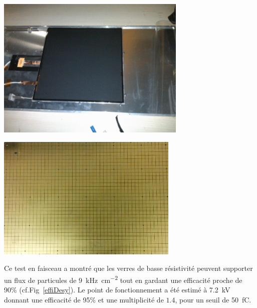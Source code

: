 \noindent
\begin{minipage}[th!]{.48\textwidth}
\centering
\includegraphics[width=0.68\textwidth]{GLA/chambre.png}
\label{chambre}
\end{minipage}%
\hfill
\begin{minipage}[th!]{.48\textwidth}
	\centering
\includegraphics[width=0.65\textwidth]{GLA/cellules.jpg}
\label{cellule}
\end{minipage}

Ce test en faisceau a montré que les verres de basse résistivité peuvent supporter un flux de particules de \SI{9}{\kilo\hertz\per\square\centi\meter} tout en gardant une efficacité proche de 90\% (cf.Fig~\ref{effiDesy}). Le point de fonctionnement a été estimé à \SI{7.2}{\kilo\volt} donnant une efficacité de 95\% et une multiplicité de $1.4$, pour un seuil de \SI{50}{\femto\coulomb}. 

